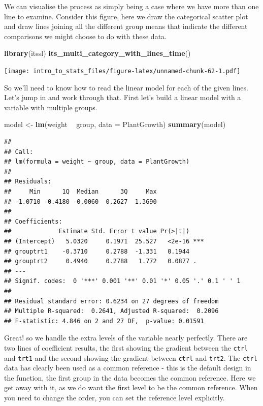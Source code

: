 \documentclass[
]{book}
\newenvironment{Shaded}{\begin{snugshade}}{\end{snugshade}}
\newcommand{\DataTypeTok}[1]{\textcolor[rgb]{0.13,0.29,0.53}{#1}}
\newcommand{\KeywordTok}[1]{\textcolor[rgb]{0.13,0.29,0.53}{\textbf{#1}}}
\newcommand{\NormalTok}[1]{#1}
\newcommand{\OperatorTok}[1]{\textcolor[rgb]{0.81,0.36,0.00}{\textbf{#1}}}
\newcommand{\StringTok}[1]{\textcolor[rgb]{0.31,0.60,0.02}{#1}}
\begin{document}
We can visualise the process as simply being a case where we have more than one line to examine. Consider this figure, here we draw the categorical scatter plot and draw lines joining all the different group means that indicate the different comparisons we might choose to do with these data.

\begin{Shaded}
\begin{Highlighting}[]
\KeywordTok{library}\NormalTok{(itssl)}
\KeywordTok{its_multi_category_with_lines_time}\NormalTok{()}
\end{Highlighting}
\end{Shaded}

\texttt{[image: intro\_to\_stats\_files/figure-latex/unnamed-chunk-62-1.pdf]}

So we'll need to know how to read the linear model for each of the given lines.
Let's jump in and work through that. First let's build a linear model with a variable with multiple groups.

\begin{Shaded}
\begin{Highlighting}[]
\NormalTok{model <-}\StringTok{ }\KeywordTok{lm}\NormalTok{(weight }\OperatorTok{~}\StringTok{ }\NormalTok{group, }\DataTypeTok{data =}\NormalTok{ PlantGrowth)}
\KeywordTok{summary}\NormalTok{(model)}
\end{Highlighting}
\end{Shaded}

\begin{verbatim}
## 
## Call:
## lm(formula = weight ~ group, data = PlantGrowth)
## 
## Residuals:
##     Min      1Q  Median      3Q     Max 
## -1.0710 -0.4180 -0.0060  0.2627  1.3690 
## 
## Coefficients:
##             Estimate Std. Error t value Pr(>|t|)    
## (Intercept)   5.0320     0.1971  25.527   <2e-16 ***
## grouptrt1    -0.3710     0.2788  -1.331   0.1944    
## grouptrt2     0.4940     0.2788   1.772   0.0877 .  
## ---
## Signif. codes:  0 '***' 0.001 '**' 0.01 '*' 0.05 '.' 0.1 ' ' 1
## 
## Residual standard error: 0.6234 on 27 degrees of freedom
## Multiple R-squared:  0.2641,	Adjusted R-squared:  0.2096 
## F-statistic: 4.846 on 2 and 27 DF,  p-value: 0.01591
\end{verbatim}

Great! so we handle the extra levels of the variable nearly perfectly. There are two lines of coefficient results, the first showing the gradient between the \texttt{ctrl} and \texttt{trt1} and the second showing the gradient between \texttt{ctrl} and \texttt{trt2}. The \texttt{ctrl} data has clearly been used as a common reference - this is the default design in the function, the first group in the data becomes the common reference. Here we get away with it, as we do want the first level to be the common reference. When you need to change the order, you can set the reference level explicitly.
\end{document}
